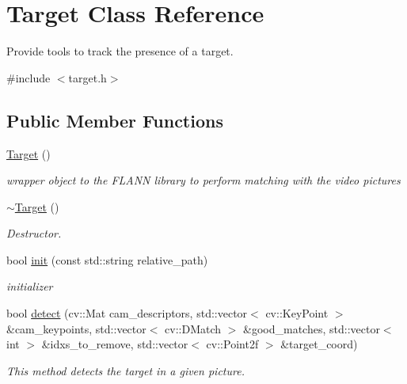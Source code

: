 \hypertarget{classTarget}{}\section{Target Class Reference}
\label{classTarget}


Provide tools to track the presence of a target.  




{\ttfamily \#include $<$target.\+h$>$}

\subsection*{Public Member Functions}
\begin{DoxyCompactItemize}
\item 
\hyperlink{classTarget_a7008d6752ce64f82e56aae6ea6c2bb65}{Target} ()
\begin{DoxyCompactList}\small\item\em wrapper object to the F\+L\+A\+NN library to perform matching with the video pictures \end{DoxyCompactList}\item 
\mbox{\label{classTarget_a18102a6c58a268fb1466771463fdc9b3}} 
\hyperlink{classTarget_a18102a6c58a268fb1466771463fdc9b3}{$\sim$\+Target} ()
\begin{DoxyCompactList}\small\item\em Destructor. \end{DoxyCompactList}\item 
\mbox{\label{classTarget_a5526dfd0f5096add631b619309445ec6}} 
bool \hyperlink{classTarget_a5526dfd0f5096add631b619309445ec6}{init} (const std\+::string relative\+\_\+path)
\begin{DoxyCompactList}\small\item\em initializer \end{DoxyCompactList}\item 
bool \hyperlink{classTarget_ab4bfd2ba3ed56a749f15e18c3a50bb1c}{detect} (cv\+::\+Mat cam\+\_\+descriptors, std\+::vector$<$ cv\+::\+Key\+Point $>$ \&cam\+\_\+keypoints, std\+::vector$<$ cv\+::\+D\+Match $>$ \&good\+\_\+matches, std\+::vector$<$ int $>$ \&idxs\+\_\+to\+\_\+remove, std\+::vector$<$ cv\+::\+Point2f $>$ \&target\+\_\+coord)
\begin{DoxyCompactList}\small\item\em This method detects the target in a given picture. \end{DoxyCompactList}\item 

\end{DoxyCompactItemize}
